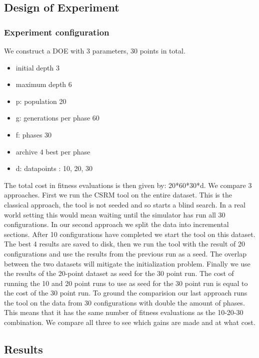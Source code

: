\subsection{Design of Experiment}
\subsubsection{Experiment configuration}
We construct a DOE with 3 parameters, 30 points in total. 
\begin{itemize}
\item initial depth 3
\item maximum depth 6
\item p: population 20
\item g: generations per phase 60
\item f: phases 30
\item archive 4 best per phase
\item d: datapoints : 10, 20, 30
\end{itemize}
The total cost in fitness evaluations is then given by: 20*60*30*d.
We compare 3 approaches. First we run the CSRM tool on the entire dataset. This is the classical approach, the tool is not seeded and so starts a blind search. In a real world setting this would mean waiting until the simulator has run all 30 configurations.
In our second approach we split the data into incremental sections. After 10 configurations have completed we start the tool on this dataset. 
The best 4 results are saved to disk, then we run the tool with the result of 20 configurations and use the results from the previous run as a seed. The overlap between the two datasets will mitigate the initialization problem. Finally we use the results of the 20-point dataset as seed for the 30 point run. 
The cost of running the 10 and 20 point runs to use as seed for the 30 point run is equal to the cost of the 30 point run. 
To ground the comparision our last approach runs the tool on the data from 30 configurations with double the amount of phases. This means that it has the same number of fitness evaluations as the 10-20-30 combination. We compare all three to see which gains are made and at what cost.
\subsection{Results}
